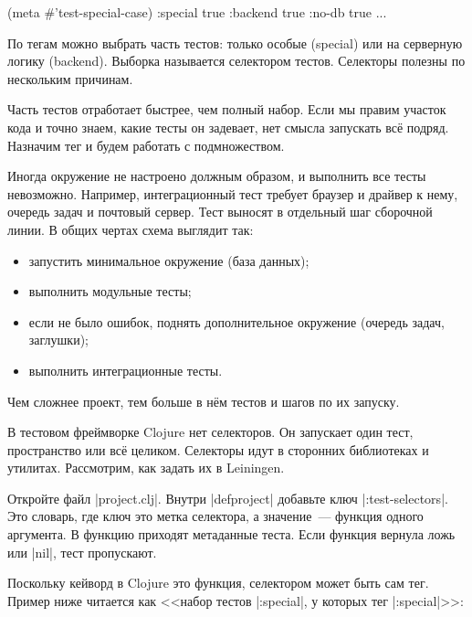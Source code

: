 \begin{english}
  \begin{clojure}
(meta #'test-special-case)
{:special true :backend true :no-db true ...}
  \end{clojure}
\end{english}

По тегам можно выбрать часть тестов: только особые (special) или на серверную
логику (backend). Выборка называется селектором тестов. Селекторы полезны по
нескольким причинам.

Часть тестов отработает быстрее, чем полный набор. Если мы правим участок кода
и точно знаем, какие тесты он задевает, нет смысла запускать всё
подряд. Назначим тег и будем работать с подмножеством.

Иногда окружение не настроено должным образом, и выполнить все тесты
невозможно. Например, интеграционный тест требует браузер и драйвер к нему,
очередь задач и почтовый сервер. Тест выносят в отдельный шаг сборочной линии. В
общих чертах схема выглядит так:

\begin{itemize}

\item
  запустить минимальное окружение (база данных);

\item
  выполнить модульные тесты;

\item
  если не было ошибок, поднять дополнительное окружение (очередь задач,
  заглушки);

\item
  выполнить интеграционные тесты.

\end{itemize}

\noindent
Чем сложнее проект, тем больше в нём тестов и шагов по их запуску.

В тестовом фреймворке Clojure нет селекторов. Он запускает один тест,
пространство или всё целиком. Селекторы идут в сторонних библиотеках и
утилитах. Рассмотрим, как задать их в Leiningen.

Откройте файл \spverb|project.clj|. Внутри \spverb|defproject| добавьте ключ
\spverb|:test-selectors|. Это словарь, где ключ это метка селектора, а
значение~--- функция одного аргумента. В функцию приходят метаданные теста. Если
функция вернула ложь или \spverb|nil|, тест пропускают.

Поскольку кейворд в Clojure это функция, селектором может быть сам тег. Пример
ниже читается как <<набор тестов \spverb|:special|, у которых тег \spverb|:special|>>:

